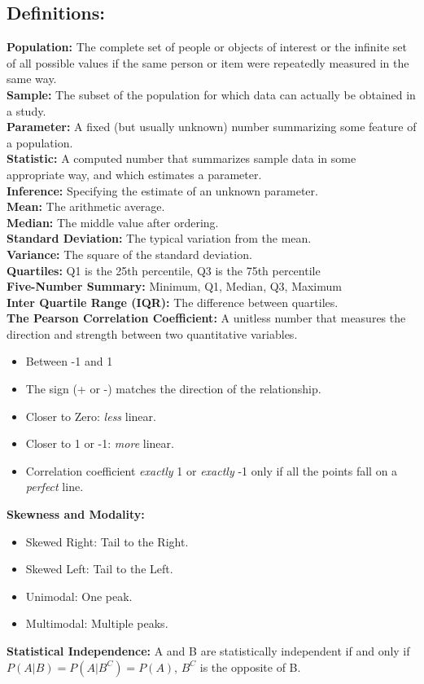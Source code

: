 \documentclass{article}
\begin{document}
\subsection*{Definitions:}
\textbf{Population:} The complete set of people or objects of interest or the infinite set of all possible values if the same person or item were repeatedly measured in the same way.
\\\textbf{Sample:} The subset of the population for which data can actually be obtained in a study.
\\\textbf{Parameter:} A fixed (but usually unknown) number summarizing some feature of a population.
\\\textbf{Statistic:} A computed number that summarizes sample data in some appropriate way, and which estimates a parameter.
\\\textbf{Inference:} Specifying the estimate of an unknown parameter.
\\\textbf{Mean:} The arithmetic average.
\\\textbf{Median:} The middle value after ordering.
\\\textbf{Standard Deviation:} The typical variation from the mean.
\\\textbf{Variance:} The square of the standard deviation.
\\\textbf{Quartiles:} Q1 is the 25th percentile, Q3 is the 75th percentile
\\\textbf{Five-Number Summary:} Minimum, Q1, Median, Q3, Maximum
\\\textbf{Inter Quartile Range (IQR):} The difference between quartiles.
\\\textbf{The Pearson Correlation Coefficient:} A unitless number that measures the direction and strength between two quantitative variables.
\begin{itemize}
    \item Between -1 and 1
    \item The sign (+ or -) matches the direction of the relationship.
    \item Closer to Zero: \textit{less} linear.
    \item Closer to 1 or -1: \textit{more} linear.
    \item Correlation coefficient \textit{exactly} 1 or \textit{exactly} -1 only if all the points fall on a \textit{perfect} line.
\end{itemize}
\textbf{Skewness and Modality:}
\begin{itemize}
    \item Skewed Right: Tail to the Right.
    \item Skewed Left: Tail to the Left.
    \item Unimodal: One peak.
    \item Multimodal: Multiple peaks.
\end{itemize}
\textbf{Statistical Independence:} 
A and B are statistically independent if and only if $P(A|B) = P(A|B^C) = P(A)$, $B^C$ is the opposite of B.
\end{document}
